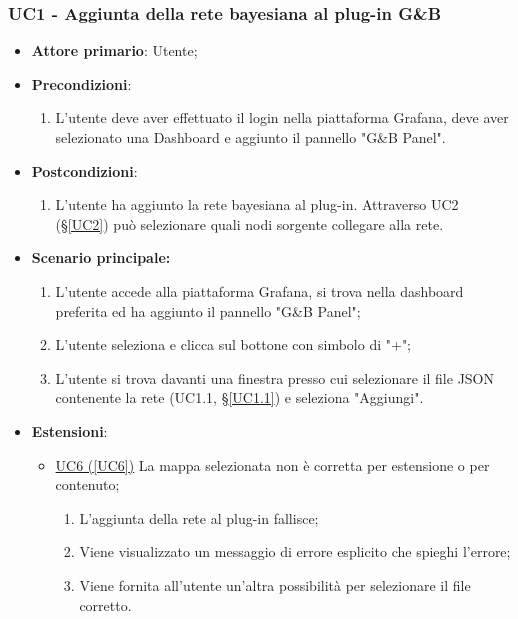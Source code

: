 \subsubsection{UC1 - Aggiunta della rete bayesiana al plug-in G\&B}\label{UC1}
\begin{itemize}
	\item \textbf{Attore primario}: Utente;
	\item \textbf{Precondizioni}:
		\begin{enumerate}
			\item L'utente deve aver effettuato il login nella piattaforma Grafana, deve aver selezionato una Dashboard e aggiunto il pannello "G\&B Panel".
		\end{enumerate}
	\item \textbf{Postcondizioni}: 
	\begin{enumerate}
		\item L'utente ha aggiunto la rete bayesiana al plug-in. Attraverso UC2 (§\ref{UC2}) può selezionare quali nodi sorgente collegare alla rete.
	\end{enumerate}
	\item \textbf{Scenario principale:}
	\begin{enumerate}
		\item L'utente accede alla piattaforma Grafana, si trova nella dashboard preferita ed ha aggiunto il pannello "G\&B Panel";
		\item L'utente seleziona e clicca sul bottone con simbolo di "+";
		\item L'utente si trova davanti una finestra presso cui selezionare il file JSON contenente la rete (UC1.1, §\ref{UC1.1}) e seleziona "Aggiungi".
	\end{enumerate}
	\item \textbf{Estensioni}:
	\begin{itemize}
		\item \hyperref[UC6]{UC6 (\ref*{UC6})} La mappa selezionata non è corretta per estensione o per contenuto;
		\begin{enumerate}
			\item L'aggiunta della rete al plug-in fallisce;
			\item Viene visualizzato un messaggio di errore esplicito che spieghi l'errore;
			\item Viene fornita all'utente un'altra possibilità per selezionare il file corretto.
		\end{enumerate}
	\end{itemize}
\end{itemize}

